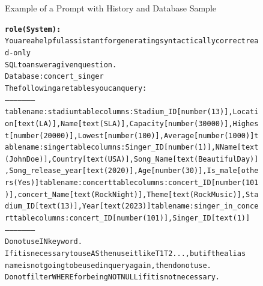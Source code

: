 \begin{figure}[H]
    \begin{AIbox}{Example of a Prompt with History and Database Sample}
        \vspace{-5px}
        \parbox{1\textwidth}{\scriptsize
        \begin{alltt} 
            {\bf role(System):} \\ 
            You are a helpful assistant for generating syntactically correct read-only                   \\
            SQL to answer a given question.                                                              \\
            Database: concert\_singer                                                                         \\
            The following are tables you can query:                                                      \\
            ---------------------                                                                        \\
            table name: stadium  table columns: Stadium\_ID [number (13)], Location [text (LA)], Name [text (SLA)], Capacity [number (30000)], Highest [number (20000)], Lowest [number (100)], Average [number (1000)] table name: singer  table columns: Singer\_ID [number (1)], NName [text (John Doe)],Country [text (USA)],Song\_Name [text (Beautiful Day)],Song\_release\_year [text (2020)],Age [number (30)],Is\_male [others (Yes)]      table name: concert  table columns: concert\_ID [number (101)],concert\_Name [text (Rock Night)],Theme [text (Rock Music)],Stadium\_ID [text (13)],Year [text (2023)]      table name: singer\_in\_concert  table columns: concert\_ID [number (101)], Singer\_ID [text (1)]       \\
            ---------------------                                                                        \\
            Do not use IN keyword.                                                                       \\
            If it is necessary to use AS then use it like T1 T2 ..., but if the alias                    \\
            name is not going to be used in query again, then do not use.                                \\
            Do not filter WHERE for being NOT NULL if it is not necessary.                               \\

\end{alltt}}
\end{AIbox}
\end{figure}
